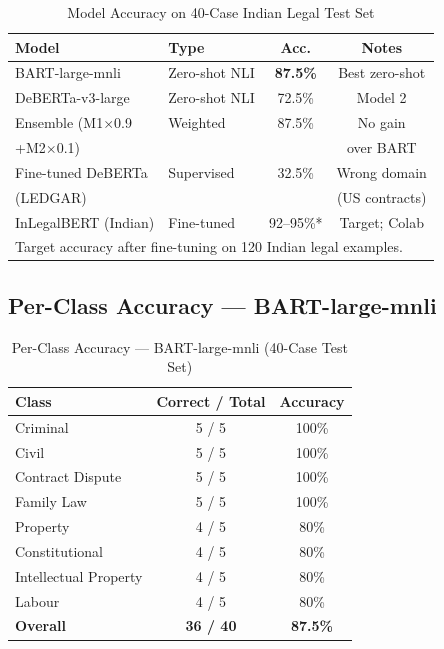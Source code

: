 \documentclass[conference]{IEEEtran}
\begin{document}
\begin{table}[ht]
\centering
\caption{Model Accuracy on 40-Case Indian Legal Test Set}
\label{tab:model_accuracy}
\renewcommand{\arraystretch}{1.15}
\begin{tabular}{llcc}
\toprule
\textbf{Model} & \textbf{Type} & \textbf{Acc.} & \textbf{Notes} \\
\midrule
BART-large-mnli          & Zero-shot NLI  & \textbf{87.5\%} & Best zero-shot \\
DeBERTa-v3-large         & Zero-shot NLI  & 72.5\%          & Model 2 \\
Ensemble (M1$\times$0.9  & Weighted       & 87.5\%          & No gain        \\
\quad+M2$\times$0.1)     &                &                 & over BART \\
Fine-tuned DeBERTa       & Supervised     & 32.5\%          & Wrong domain   \\
\quad(LEDGAR)            &                &                 & (US contracts) \\
InLegalBERT (Indian)     & Fine-tuned     & 92--95\%*       & Target; Colab  \\
\bottomrule
\multicolumn{4}{l}{\scriptsize *Target accuracy after fine-tuning on 120
  Indian legal examples.}
\end{tabular}
\end{table}

\subsection{Per-Class Accuracy — BART-large-mnli}

\begin{table}[ht]
\centering
\caption{Per-Class Accuracy — BART-large-mnli (40-Case Test Set)}
\label{tab:perclass}
\renewcommand{\arraystretch}{1.1}
\begin{tabular}{lcc}
\toprule
\textbf{Class} & \textbf{Correct / Total} & \textbf{Accuracy} \\
\midrule
Criminal             & 5 / 5  & 100\% \\
Civil                & 5 / 5  & 100\% \\
Contract Dispute     & 5 / 5  & 100\% \\
Family Law           & 5 / 5  & 100\% \\
Property             & 4 / 5  & 80\%  \\
Constitutional       & 4 / 5  & 80\%  \\
Intellectual Property& 4 / 5  & 80\%  \\
Labour               & 4 / 5  & 80\%  \\
\midrule
\textbf{Overall}     & \textbf{36 / 40} & \textbf{87.5\%} \\
\bottomrule
\end{tabular}
\end{table}
\end{document}
